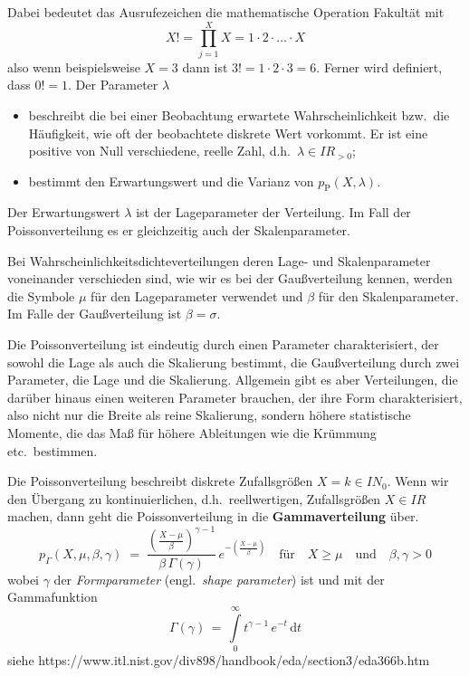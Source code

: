 Dabei bedeutet das Ausrufezeichen die mathematische Operation Fakultät mit
$$
X! = \prod\limits_{j=1}^{X} X = 1 \cdot 2 \cdot \dots \cdot X
$$
also wenn  beispielsweise $X = 3$ dann ist $3! = 1 \cdot 2 \cdot 3 = 6$.
Ferner wird definiert, dass $0! = 1$.
Der Parameter $\lambda$
\begin{itemize}
\item beschreibt die bei einer Beobachtung erwartete Wahrscheinlichkeit bzw.\ die
Häufigkeit, wie oft der beobachtete diskrete Wert vorkommt. Er ist eine
positive von Null verschiedene, reelle Zahl, d.h.\ $\lambda \in I\!\!R_{> 0}$;
\item bestimmt den Erwartungswert und die Varianz von $p_\mathrm{P}(X, \lambda)$.
\end{itemize}
Der Erwartungswert $\lambda$ ist der Lageparameter der Verteilung.
Im Fall der Poissonverteilung es er gleichzeitig auch der Skalenparameter.

Bei Wahrscheinlichkeitsdichteverteilungen deren Lage- und Skalenparameter
voneinander verschieden sind, wie wir es bei der Gaußverteilung kennen, werden die
Symbole $\mu$ für den Lageparameter verwendet und $\beta$ für den Skalenparameter.
Im Falle der Gaußverteilung ist $\beta = \sigma$.

Die Poissonverteilung ist eindeutig durch einen Parameter charakterisiert, der sowohl
die Lage als auch die Skalierung bestimmt, die Gaußverteilung durch zwei Parameter, die
Lage und die Skalierung. Allgemein gibt es aber Verteilungen, die darüber hinaus einen
weiteren Parameter brauchen, der ihre Form charakterisiert, also nicht nur die Breite als
reine Skalierung, sondern höhere statistische Momente, die das Maß für höhere Ableitungen
wie die Krümmung etc.\ bestimmen.

Die Poissonverteilung beschreibt diskrete Zufallsgrößen $X = k \in I \!\! N_0$. Wenn wir den Übergang
zu kontinuierlichen, d.h.\ reellwertigen, Zufallsgrößen $X \in I \!\! R$ machen, dann geht die
Poissonverteilung in die \textbf{Gammaverteilung} über.
\begin{equation}
p_\Gamma(X, \mu, \beta, \gamma) \; = \; \frac{\left(\frac{X - \mu}{\beta}\right)^{\gamma-1}}{\beta \, \Gamma(\gamma)}
 \, e^{-\left(\frac{X - \mu}{\beta}\right)}
 \quad \text{f\"ur} \quad X \geq \mu \quad \text{und} \quad \beta, \gamma > 0
\label{Gammaverteilung}
\end{equation}
wobei $\gamma$ der \textsl{Formparameter} (engl.\ \textsl{shape parameter}) ist und mit der Gammafunktion
$$
\Gamma(\gamma) \, = \, \int\limits_{0}^{\infty} t^{\gamma - 1} \, e^{-t} \, \mathrm{d}t
$$
siehe https://www.itl.nist.gov/div898/handbook/eda/section3/eda366b.htm

